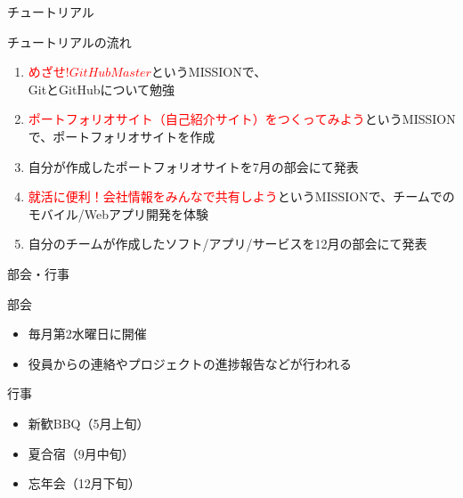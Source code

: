 \documentclass[12pt, unicode]{beamer}
\begin{document}
\begin{frame}{チュートリアル}
    \begin{block}{チュートリアルの流れ}
        \begin{enumerate}
            \item \textcolor{red}{$めざせ!GitHubMaster$}というMISSIONで、\\ GitとGitHubについて勉強
            \item \textcolor{red}{$ポートフォリオサイト（自己紹介サイト）をつくってみよう$}というMISSIONで、ポートフォリオサイトを作成
            \item 自分が作成したポートフォリオサイトを7月の部会にて発表
            \item \textcolor{red}{$就活に便利！会社情報をみんなで共有しよう$}というMISSIONで、チームでのモバイル/Webアプリ開発を体験
            \item 自分のチームが作成したソフト/アプリ/サービスを12月の部会にて発表
        \end{enumerate}
    \end{block}
\end{frame}

\begin{frame}{部会・行事}
    \begin{block}{部会}
        \begin{itemize}
            \item 毎月第2水曜日に開催
            \item 役員からの連絡やプロジェクトの進捗報告などが行われる
        \end{itemize}
    \end{block}

    \begin{block}{行事}
        \begin{itemize}
            \item 新歓BBQ（5月上旬）
            \item 夏合宿（9月中旬）
            \item 忘年会（12月下旬）
        \end{itemize}
    \end{block}
\end{frame}
\end{document}
